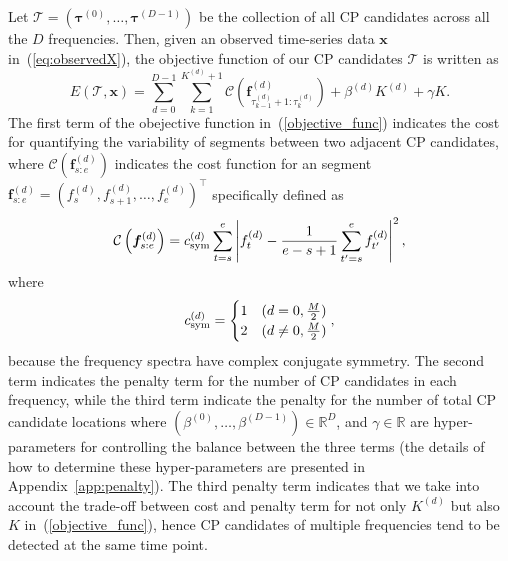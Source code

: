 Let $\bm{\mathcal{T}} = (\bm{\tau}^{(0)}, \dots, \bm{\tau}^{(D-1)})$ be the collection of all CP candidates across all the $D$ frequencies.
%
Then, given an observed time-series data $\bm{x}$ in~(\ref{eq:observedX}), the objective function of our CP candidates $\bm{\mathcal{T}}$ is written as
\begin{equation}
  E(\bm{\mathcal{T}}, \bm{x}) = \sum_{d=0}^{D-1} \sum_{k=1}^{K^{(d)}+1} \mathcal{C} \left(\bm{f}_{\tau_{k - 1}^{(d)}+1 : \tau_k^{(d)}}^{(d)}\right) + \beta^{(d)} K^{(d)} + \gamma K. \label{objective_func}
\end{equation}
%
The first term of the obejective function in~(\ref{objective_func}) indicates the cost for quantifying the variability of segments between two adjacent CP candidates, where
$\mathcal{C}\left(\bm f_{s:e}^{(d)}\right)$
indicates the cost function for an segment $\bm{f}_{s:e}^{(d)} = (f_s^{(d)}, f_{s+1}^{(d)}, \ldots, f_{e}^{(d)})^\top$ specifically defined as
\begin{equation}
  \mathcal{C}\left(\bm{f}_{s:e}^{(d)}\right) = c_{\text{sym}}^{(d)} \sum_{t = s}^{e} \left|{f}_t^{(d)} - \frac{1}{e - s + 1} \sum_{t' = s}^e f_{t'}^{(d)}\right|^2, \notag
\end{equation} 
where 
\begin{equation}
  c_{\text{sym}}^{(d)} =
  \begin{cases}
    1 & (d = 0, \frac{M}{2}) \\
    2 & (d \neq 0, \frac{M}{2})  
  \end{cases}, \notag
\end{equation} 
because the frequency spectra have complex conjugate symmetry.
%
The second term indicates the penalty term for the number of CP candidates in each frequency, while the third term indicate the penalty for the number of total CP candidate locations where $(\beta^{(0)}, \dots, \beta^{(D-1)}) \in \mathbb{R}^{D}$, and $\gamma \in \mathbb{R}$ are hyper-parameters for controlling the balance between the three terms (the details of how to determine these hyper-parameters are presented in Appendix~\ref{app:penalty}).
%
The third penalty term indicates that we take into account the trade-off between cost and penalty term for not only $K^{(d)}$ but also $K$ in~(\ref{objective_func}), hence CP candidates of multiple frequencies tend to be detected at the same time point.

